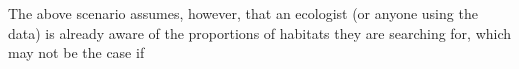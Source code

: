 
The above scenario assumes, however, that an ecologist (or anyone using the data) is already aware of the proportions of habitats they are searching for, which may not be the case if 
